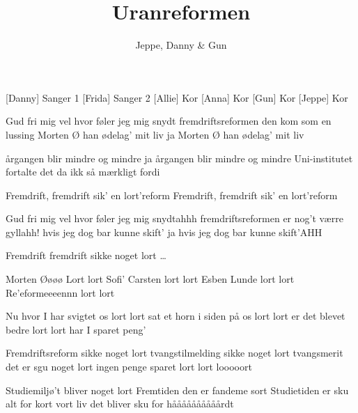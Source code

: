 \documentclass[a4paper,11pt]{article}
\title{Uranreformen}
\author{Jeppe, Danny \& Gun}
\begin{document}
\maketitle

\begin{roles}
    [Danny] Sanger 1
    [Frida] Sanger 2
    [Allie] Kor
    [Anna] Kor
    [Gun] Kor
    [Jeppe] Kor
\end{roles}


\begin{song}
 Gud fri mig vel
hvor føler jeg mig snydt
fremdriftsreformen den kom
som en lussing
Morten Ø han ødelag’ mit liv
ja Morten Ø han ødelag’ mit liv

årgangen blir mindre og mindre
ja årgangen blir mindre og mindre
Uni-institutet fortalte
det da ikk så mærkligt fordi

Fremdrift, fremdrift sik’ en lort’reform
Fremdrift, fremdrift sik’ en lort’reform


Gud fri mig vel
hvor føler jeg mig snydtahhh
fremdriftsreformen er nog’t værre gyllahh!
hvis jeg dog bar kunne skift’
ja hvis jeg dog bar kunne skift’AHH

Fremdrift fremdrift sikke noget lort
…

Morten Øøøø
Lort lort
Sofi’ Carsten
lort lort
Esben Lunde
lort lort
Re’eformeeeennn
 lort lort


Nu hvor I har svigtet os
 lort lort
sat et horn i siden på os
 lort lort
er det blevet bedre
 lort lort
har I sparet peng’

Fremdriftsreform sikke noget lort
tvangstilmelding sikke noget lort
tvangsmerit det er sgu noget lort
ingen penge sparet lort lort looooort

Studiemiljø’t bliver noget lort
Fremtiden den er fandeme sort
Studietiden er sku alt for kort
vort liv det bliver sku for håååååååååårdt

\end{song}
\end{document}
